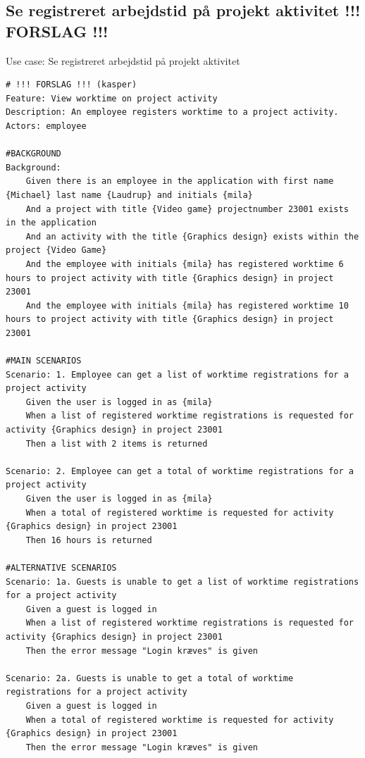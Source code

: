 \subsection{Se registreret arbejdstid på projekt aktivitet !!! FORSLAG !!!}
\begin{listing}[H]
    \centering
    \caption{Use case: Se registreret arbejdstid på projekt aktivitet} \label{lst:usecase_view_worktime_projectactivity}
    \begin{verbatim}  
# !!! FORSLAG !!! (kasper)
Feature: View worktime on project activity
Description: An employee registers worktime to a project activity.
Actors: employee

#BACKGROUND
Background:
    Given there is an employee in the application with first name {Michael} last name {Laudrup} and initials {mila}
    And a project with title {Video game} projectnumber 23001 exists in the application
    And an activity with the title {Graphics design} exists within the project {Video Game}
    And the employee with initials {mila} has registered worktime 6 hours to project activity with title {Graphics design} in project 23001
    And the employee with initials {mila} has registered worktime 10 hours to project activity with title {Graphics design} in project 23001

#MAIN SCENARIOS
Scenario: 1. Employee can get a list of worktime registrations for a project activity
    Given the user is logged in as {mila}
    When a list of registered worktime registrations is requested for activity {Graphics design} in project 23001
    Then a list with 2 items is returned

Scenario: 2. Employee can get a total of worktime registrations for a project activity
    Given the user is logged in as {mila}
    When a total of registered worktime is requested for activity {Graphics design} in project 23001
    Then 16 hours is returned

#ALTERNATIVE SCENARIOS
Scenario: 1a. Guests is unable to get a list of worktime registrations for a project activity
    Given a guest is logged in
    When a list of registered worktime registrations is requested for activity {Graphics design} in project 23001
    Then the error message "Login kræves" is given

Scenario: 2a. Guests is unable to get a total of worktime registrations for a project activity
    Given a guest is logged in
    When a total of registered worktime is requested for activity {Graphics design} in project 23001
    Then the error message "Login kræves" is given

    \end{verbatim}
\end{listing}


